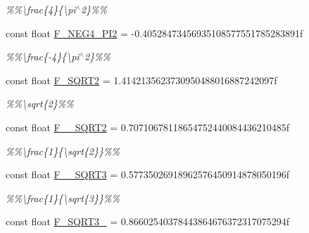 \begin{DoxyCompactItemize}
\begin{DoxyCompactList}\small\item\em \%\%\textbackslash{}frac\{4\}\{\textbackslash{}pi$^\wedge$2\}\%\% \end{DoxyCompactList}\item 
\hypertarget{group___scalar_math_consts_ga197e5a6509678e965eefa2f9dbc395c6}{}const float \hyperlink{group___scalar_math_consts_ga197e5a6509678e965eefa2f9dbc395c6}{F\+\_\+\+N\+E\+G4\+\_\+\+P\+I2} = -\/0.\+40528473456935108577551785283891f\label{group___scalar_math_consts_ga197e5a6509678e965eefa2f9dbc395c6}

\begin{DoxyCompactList}\small\item\em \%\%\textbackslash{}frac\{-\/4\}\{\textbackslash{}pi$^\wedge$2\}\%\% \end{DoxyCompactList}\item 
\hypertarget{group___scalar_math_consts_ga43677e4b78975d594a04bc8dadedbc60}{}const float \hyperlink{group___scalar_math_consts_ga43677e4b78975d594a04bc8dadedbc60}{F\+\_\+\+S\+Q\+R\+T2} = 1.\+4142135623730950488016887242097f\label{group___scalar_math_consts_ga43677e4b78975d594a04bc8dadedbc60}

\begin{DoxyCompactList}\small\item\em \%\%\textbackslash{}sqrt\{2\}\%\% \end{DoxyCompactList}\item 
\hypertarget{group___scalar_math_consts_ga068bdf7e4cc23958b4a0ff5807e830b9}{}const float \hyperlink{group___scalar_math_consts_ga068bdf7e4cc23958b4a0ff5807e830b9}{F\+\_\+\_\+\+S\+Q\+R\+T2} = 0.\+70710678118654752440084436210485f\label{group___scalar_math_consts_ga068bdf7e4cc23958b4a0ff5807e830b9}

\begin{DoxyCompactList}\small\item\em \%\%\textbackslash{}frac\{1\}\{\textbackslash{}sqrt\{2\}\}\%\% \end{DoxyCompactList}\item 
\hypertarget{group___scalar_math_consts_gad8ae4d5759b4629d01fb9f58a4b4b331}{}const float \hyperlink{group___scalar_math_consts_gad8ae4d5759b4629d01fb9f58a4b4b331}{F\+\_\+\_\+\+S\+Q\+R\+T3} = 0.\+57735026918962576450914878050196f\label{group___scalar_math_consts_gad8ae4d5759b4629d01fb9f58a4b4b331}

\begin{DoxyCompactList}\small\item\em \%\%\textbackslash{}frac\{1\}\{\textbackslash{}sqrt\{3\}\}\%\% \end{DoxyCompactList}\item 
\hypertarget{group___scalar_math_consts_ga3fef44c3a45acdde18067f03eb073098}{}const float \hyperlink{group___scalar_math_consts_ga3fef44c3a45acdde18067f03eb073098}{F\+\_\+\+S\+Q\+R\+T3\+\_} = 0.\+86602540378443864676372317075294f\label{group___scalar_math_consts_ga3fef44c3a45acdde18067f03eb073098}


\end{DoxyCompactItemize}
